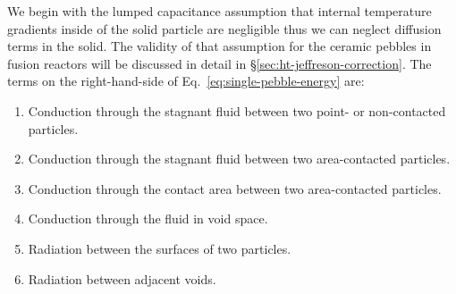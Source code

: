 We begin with the lumped capacitance assumption that internal temperature gradients inside of the solid particle are negligible thus we can neglect diffusion terms in the solid. The validity of that assumption for the ceramic pebbles in fusion reactors will be discussed in detail in \S\ref{sec:ht-jeffreson-correction}. The terms on the right-hand-side of Eq.~\ref{eq:single-pebble-energy} are:

\begin{enumerate}
\item Conduction through the stagnant fluid between two point- or non-contacted particles.
\item Conduction through the stagnant fluid between two area-contacted particles.
\item Conduction through the contact area between two area-contacted particles.
\item Conduction through the fluid in void space. 
\item Radiation between the surfaces of two particles.
\item Radiation between adjacent voids.
\end{enumerate}




